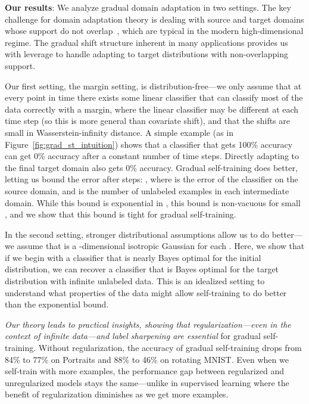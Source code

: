 \documentclass[11pt]{article}
\newcommand{\pl}[1]{}
\newcommand{\ak}[1]{}
\begin{document}
\textbf{Our results}: We analyze gradual domain adaptation in two settings.
The key challenge for domain adaptation theory is dealing with source and target domains whose support do not overlap~\cite{zhao2019zhao, shu2018dirtt}, which are typical in the modern high-dimensional regime.
The gradual shift structure inherent in many applications provides us with leverage to handle adapting to target distributions with non-overlapping support.

Our first setting, the margin setting, is distribution-free---we only assume that at every point in time there exists some linear classifier that can classify most of the data correctly with a margin, where the linear classifier may be different at each time step (so this is more general than covariate shift), and that the shifts are small in Wasserstein-infinity distance.
A simple example (as in Figure~\ref{fig:grad_st_intuition}) shows that a classifier that gets 100\% accuracy can get 0\% accuracy after a constant number of time steps.
Directly adapting to the final target domain also gets 0\% accuracy.
Gradual self-training does better, letting us bound the error after  steps: , where  is the error of the classifier on the source domain, and  is the number of unlabeled examples in each intermediate domain.
While this bound is exponential in , this bound is non-vacuous for small , and we show that this bound is tight for gradual self-training.

In the second setting, stronger distributional assumptions allow us to do better---we assume that  is a -dimensional isotropic Gaussian for each . Here, we show that if we begin with a classifier  that is nearly Bayes optimal for the initial distribution, we can recover a classifier  that is Bayes optimal for the target distribution with infinite unlabeled data.
This is an idealized setting to understand what properties of the data might allow self-training to do better than the exponential bound.

\emph{Our theory leads to practical insights, showing that regularization---even in the context of infinite data---and label sharpening are essential} for gradual self-training. Without regularization, the accuracy of gradual self-training drops from 84\% to 77\% on Portraits and 88\% to 46\% on rotating MNIST. Even when we self-train with more examples, the performance gap between regularized and unregularized models stays the same---unlike in supervised learning where the benefit of regularization diminishes as we get more examples.
\pl{I was expecting some results for label sharpening; people might not even know what label sharpening is...}
\ak{Ah I see, it seems like a slightly less major point, and hard to define---what do you think?}
\pl{just thinking about it, label sharpening is a bit of a misnomer - we're sharpening the distribution over labels, not the labels,
but I don't have any other better ideas}
\end{document}

